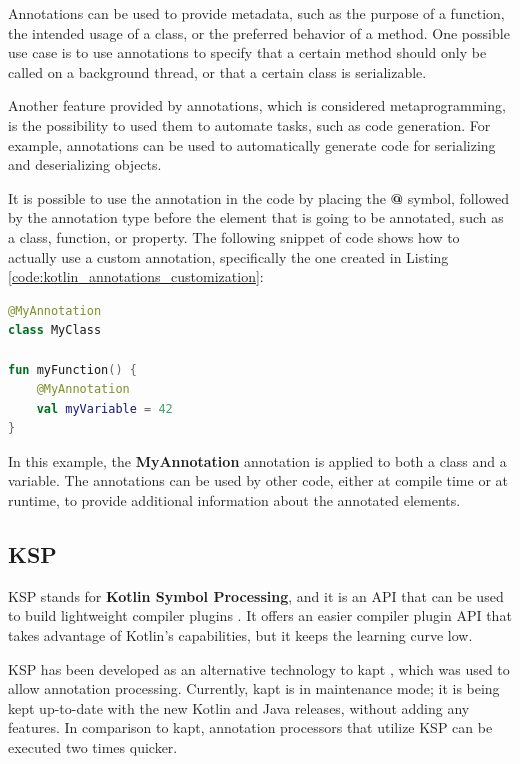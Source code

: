 Annotations can be used to provide metadata, such as the purpose of a function, the intended usage of a class, or the preferred behavior of a method. One possible use case is to use annotations to specify that a certain method should only be called on a background thread, or that a certain class is serializable.

Another feature provided by annotations, which is considered metaprogramming, is the possibility to used them to automate tasks, such as code generation. For example, annotations can be used to automatically generate code for serializing and deserializing objects.

It is possible to use the annotation in the code by placing the \textbf{@} symbol, followed by the annotation type before the element that is going to be annotated, such as a class, function, or property.\newline
The following snippet of code shows how to actually use a custom annotation, specifically the one created in Listing \ref{code:kotlin_annotations_customization}:
\begin{lstlisting}[caption={Example of usage of a custom annotation in Kotlin}, language=Kotlin, captionpos=b, label={code:kotlin_annotations_usage}]
@MyAnnotation
class MyClass

fun myFunction() {
    @MyAnnotation
    val myVariable = 42
}
\end{lstlisting}
In this example, the \textbf{MyAnnotation} annotation is applied to both a class and a variable. The annotations can be used by other code, either at compile time or at runtime, to provide additional information about the annotated elements.

\subsection{KSP}
KSP stands for \textbf{Kotlin Symbol Processing}, and it is an API that can be used to build lightweight compiler plugins \cite{ksp_documentation}. It offers an easier compiler plugin API that takes advantage of Kotlin's capabilities, but it keeps the learning curve low.

KSP has been developed as an alternative technology to kapt \cite{kapt_documentation}, which was used to allow annotation processing. Currently, kapt is in maintenance mode; it is being kept up-to-date with the new Kotlin and Java releases, without adding any features.\newline
In comparison to kapt, annotation processors that utilize KSP can be executed two times quicker.

